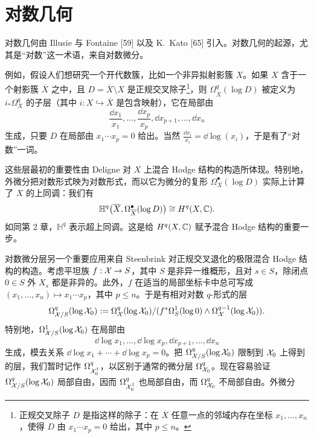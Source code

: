 \section{对数几何}

对数几何由 Illusie 与 Fontaine [59] 以及 K.~Kato [65] 引入。对数几何的起源，尤其是“对数”这一术语，来自对数微分。

例如，假设人们想研究一个开代数簇，比如一个非异拟射影簇 $X$。如果 $X$ 含于一个射影簇 $\overline{X}$ 之中，且 $D=\overline{X}\setminus X$ 是正规交叉除子\footnote{正规交叉除子 $D$ 是指这样的除子：在 $\overline{X}$ 任意一点的邻域内存在坐标 $x_1,\ldots,x_n$，使得 $D$ 由 $x_1\cdots x_p=0$ 给出，其中 $p\le n$。}，则 $\Omega^q_{\overline{X}}(\log D)$ 被定义为 $i_*\Omega^q_X$ 的子层（其中 $i:X\hookrightarrow\overline{X}$ 是包含映射），它在局部由
\[
  \frac{\dd x_1}{x_1},\ldots,\frac{\dd x_p}{x_p},\dd x_{p+1},\ldots,\dd x_n
\]
生成，只要 $D$ 在局部由 $x_1\cdots x_p=0$ 给出。当然 $\frac{\dd x_i}{x_i}=\dd\log(x_i)$，于是有了“对数”一词。

这些层最初的重要性由 Deligne 对 $X$ 上混合 Hodge 结构的构造所体现。特别地，外微分把对数形式映为对数形式，而以它为微分的复形 $\Omega^{\bullet}_{\overline{X}}(\log D)$ 实际上计算了 $X$ 的上同调：我们有
\[
  \mathbb{H}^q\bigl(\overline{X},\Omega^{\bullet}_{\overline{X}}(\log D)\bigr)\cong H^q(X,\mathbb{C}).
\]
如同第 2 章，$\mathbb{H}^q$ 表示超上同调。这是给 $H^q(X,\mathbb{C})$ 赋予混合 Hodge 结构的重要一步。


对数微分层另一个重要应用来自 Steenbrink 对正规交叉退化的极限混合 Hodge 结构的构造。考虑平坦族 $f:\mathcal{X}\to S$，其中 $S$ 是非异一维概形，且对 $s\in S$，除闭点 $0\in S$ 外 $X_s$ 都是非异的。此外，$f$ 在适当的局部坐标卡中总可写成 $(x_1,\ldots,x_n)\mapsto x_1\cdots x_p$，其中 $p\le n$。于是有相对对数 $q$-形式的层
\[
  \Omega^q_{\mathcal{X}/S}(\log \mathcal{X}_0):=\Omega^q_{\mathcal{X}}(\log \mathcal{X}_0)/(f^*\Omega^1_S(\log 0)\wedge\Omega^{q-1}_{\mathcal{X}}(\log \mathcal{X}_0)).
\]
特别地，$\Omega^1_{\mathcal{X}/S}(\log \mathcal{X}_0)$ 在局部由
\[
  \dd\log x_1,\ldots,\dd\log x_p,\dd x_{p+1},\ldots,\dd x_n
\]
生成，模去关系 $\dd\log x_1+\cdots+\dd\log x_p=0$。把 $\Omega^q_{\mathcal{X}/S}(\log \mathcal{X}_0)$ 限制到 $\mathcal{X}_0$ 上得到的层，我们暂时记作 $\Omega^q_{\mathcal{X}_0^\dagger}$，以区别于通常的微分层 $\Omega^q_{\mathcal{X}_0}$。现在容易验证 $\Omega^q_{\mathcal{X}/S}(\log \mathcal{X}_0)$ 局部自由，因而 $\Omega^q_{\mathcal{X}_0^\dagger}$ 也局部自由，而 $\Omega^q_{\mathcal{X}_0}$ 不局部自由。外微分


